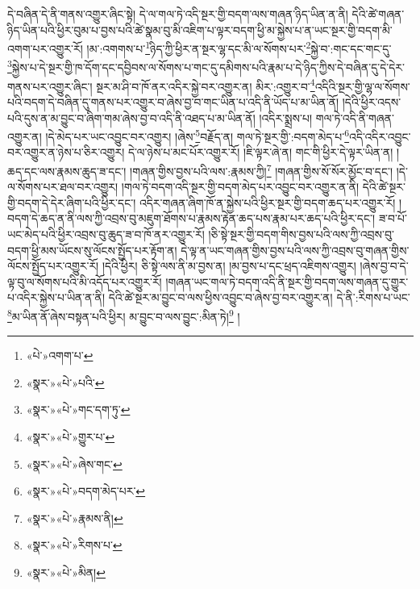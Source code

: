 དེ་བཞིན་དེ་ནི་གནས་འགྱུར་ཞིང་སྟེ། དེ་ལ་གལ་ཏེ་འདི་སྔར་གྱི་བདག་ལས་གཞན་ཉིད་ཡིན་ན་ནི། དེའི་ཚེ་གཞན་ཉིད་ཡིན་པའི་ཕྱིར་བུམ་པ་བྱས་པའི་ཚེ་སྣམ་བུ་མི་འཇིག་པ་ལྟར་བདག་ཕྱི་མ་སྐྱེས་པ་ན་ཡང་སྔར་གྱི་བདག་མི་འགག་པར་འགྱུར་རོ། །མ་:འགགས་པ་\footnote{«པེ་»འགག་པ་}ཉིད་ཀྱི་ཕྱིར་ན་སྔར་ལྷ་དང་མི་ལ་སོགས་པར་\footnote{«སྣར་»«པེ་»པའི་}སྐྱེ་བ་:གང་དང་གང་དུ་\footnote{«སྣར་»«པེ་»གང་དག་ཏུ་}སྐྱེས་པ་དེ་སྔར་གྱི་ཁ་དོག་དང་དབྱིབས་ལ་སོགས་པ་གང་དུ་དམིགས་པའི་རྣམ་པ་དེ་ཉིད་ཀྱིས་དེ་བཞིན་དུ་དེ་དེར་གནས་པར་འགྱུར་ཞིང་། སྔར་མ་ཤི་བ་ཁོ་ནར་འདིར་སྐྱེ་བར་འགྱུར་ན། མིར་:འགྱུར་བ་\footnote{«སྣར་»«པེ་»གྱུར་པ་}འདིའི་སྔར་གྱི་ལྷ་ལ་སོགས་པའི་བདག་དེ་བཞིན་དུ་གནས་པར་འགྱུར་བ་ཞེས་བྱ་བ་གང་ཡིན་པ་འདི་ནི་ཡོད་པ་མ་ཡིན་ནོ། །དེའི་ཕྱིར་འདས་པའི་དུས་ན་མ་བྱུང་བ་ཞིག་གམ་ཞེས་བྱ་བ་འདི་ནི་འཐད་པ་མ་ཡིན་ནོ། །འདིར་སྨྲས་པ། གལ་ཏེ་འདི་ནི་གཞན་འགྱུར་ན། །དེ་མེད་པར་ཡང་འབྱུང་བར་འགྱུར། །ཞེས་\footnote{«སྣར་»«པེ་»ཞེས་གང་}བརྗོད་ན། གལ་ཏེ་སྔར་གྱི་:བདག་མེད་པ་\footnote{«སྣར་»«པེ་»བདག་མེད་པར་}འདི་འདིར་འབྱུང་བར་འགྱུར་ན་ཉེས་པ་ཅིར་འགྱུར། དེ་ལ་ཉེས་པ་མང་པོར་འགྱུར་རོ། །ཇི་ལྟར་ཞེ་ན། གང་གི་ཕྱིར་དེ་ལྟར་ཡིན་ན། །ཆད་དང་ལས་རྣམས་ཆུད་ཟ་དང་། །གཞན་གྱིས་བྱས་པའི་ལས་:རྣམས་ཀྱི།\footnote{«སྣར་»«པེ་»རྣམས་ནི།} །གཞན་གྱིས་སོ་སོར་མྱོང་བ་དང་། །དེ་ལ་སོགས་པར་ཐལ་བར་འགྱུར། །གལ་ཏེ་བདག་འདི་སྔར་གྱི་བདག་མེད་པར་འབྱུང་བར་འགྱུར་ན་ནི། དེའི་ཚེ་སྔར་གྱི་བདག་དེ་དེར་ཞིག་པའི་ཕྱིར་དང་། འདིར་གཞན་ཞིག་ཁོ་ན་སྐྱེས་པའི་ཕྱིར་སྔར་གྱི་བདག་ཆད་པར་འགྱུར་རོ། །བདག་དེ་ཆད་ན་ནི་ལས་ཀྱི་འབྲས་བུ་མཇུག་ཐོགས་པ་རྣམས་རྟེན་ཆད་པས་རྣམ་པར་ཆད་པའི་ཕྱིར་དང་། ཟ་བ་པོ་ཡང་མེད་པའི་ཕྱིར་འབྲས་བུ་ཆུད་ཟ་བ་ཁོ་ནར་འགྱུར་རོ། །ཅི་སྟེ་སྔར་གྱི་བདག་གིས་བྱས་པའི་ལས་ཀྱི་འབྲས་བུ་བདག་ཕྱི་མས་ཡོངས་སུ་ལོངས་སྤྱོད་པར་རྟོག་ན། དེ་ལྟ་ན་ཡང་གཞན་གྱིས་བྱས་པའི་ལས་ཀྱི་འབྲས་བུ་གཞན་གྱིས་ལོངས་སྤྱོད་པར་འགྱུར་རོ། །དེའི་ཕྱིར། ཅི་སྟེ་ལས་ནི་མ་བྱས་ན། །མ་བྱས་པ་དང་ཕྲད་འཇིགས་འགྱུར། །ཞེས་བྱ་བ་དེ་ལྟ་བུ་ལ་སོགས་པའི་མི་འདོད་པར་འགྱུར་རོ། །གཞན་ཡང་གལ་ཏེ་བདག་འདི་ནི་སྔར་གྱི་བདག་ལས་གཞན་དུ་གྱུར་པ་འདིར་སྐྱེས་པ་ཡིན་ན་ནི། དེའི་ཚེ་སྔར་མ་བྱུང་བ་ལས་ཕྱིས་འབྱུང་བ་ཞེས་བྱ་བར་འགྱུར་ན། དེ་ནི་:རིགས་པ་ཡང་\footnote{«སྣར་»«པེ་»རིགས་པ་}མ་ཡིན་ནོ་ཞེས་བསྟན་པའི་ཕྱིར། མ་བྱུང་བ་ལས་བྱུང་:མིན་ཏེ།\footnote{«སྣར་»«པེ་»མིན།} །
